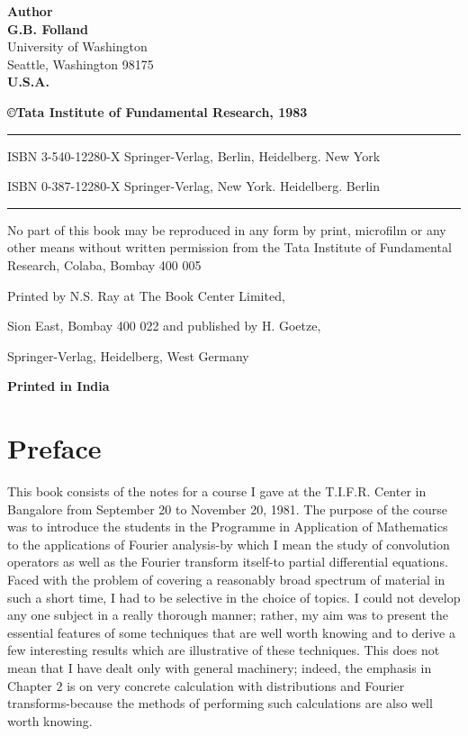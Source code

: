 \thispagestyle{empty}
\begin{center}
{\bf Author}\\[10pt]
{\large\bf G.B. Folland}\\[5pt]
{University of Washington}\\[5pt]
{Seattle, Washington 98175}\\[5pt]
{\bf U.S.A.}

\vfill
{\bf\copyright Tata Institute of Fundamental Research, 1983}
\vfill

\rule{\textwidth}{.5pt}

ISBN 3-540-12280-X Springer-Verlag, Berlin, Heidelberg. New York

ISBN 0-387-12280-X Springer-Verlag, New York. Heidelberg. Berlin

\rule{\textwidth}{.5pt}
\vfill

\parbox{0.7\textwidth}{
No part of this book may be reproduced in any form by print, microfilm
or any other means without written permission from the Tata Institute
of Fundamental Research, Colaba, Bombay 400 005}
\vfill

Printed by N.S. Ray at The Book Center Limited,

Sion East, Bombay 400 022 and published by H. Goetze,

Springer-Verlag, Heidelberg, West Germany

\vskip 1cm

{\large\bf Printed in India}
\end{center}

\eject



\chapter*{Preface}



	This book consists of the notes for a course I gave at the
        T.I.F.R. Center in Bangalore from September 20 to November
        20, 1981. The purpose of the course was to introduce the
        students in the Programme in Application of Mathematics to the
        applications of Fourier analysis-by which I mean the study
        of convolution operators as well as the Fourier transform
        itself-to partial differential equations. Faced with the
        problem of covering a reasonably broad spectrum of material in
        such a short time, I had to be selective in the choice of
        topics. I could not develop any one subject in a really
        thorough manner; rather, my aim was to present the essential
        features of some techniques that are well worth knowing and to
        derive a few interesting results which are illustrative of
        these techniques. This does not mean that I have dealt only
        with general 
        machinery; indeed, the emphasis in Chapter $2$ is on very
        concrete calculation with distributions and Fourier
        transforms-because the methods of performing such calculations
        are also well worth knowing. 

